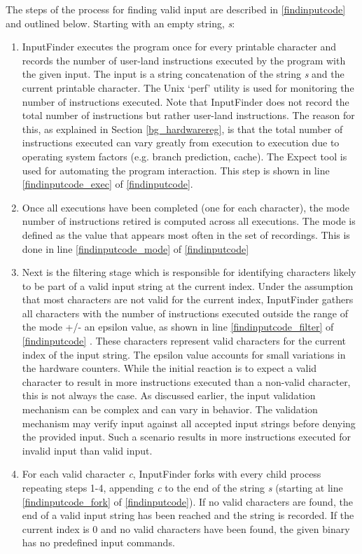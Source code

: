 \documentclass{acm_proc_article-sp}
\def \tool {InputFinder}
\begin{document}
The steps of the process for finding valid input are described in \autoref{findinputcode} and outlined below. Starting with an empty string, \textit{s}:
\begin{enumerate}
\item \tool{} executes the program once for every printable character and records the number of user-land instructions executed by the program with the given input. The input is a string concatenation of the string \textit{s} and the current printable character. The Unix `perf' utility is used for monitoring the number of instructions executed. Note that \tool{} does not record the total number of instructions but rather user-land instructions. The reason for this, as explained in Section \ref{bg_hardwarereg}, is that the total number of instructions executed can vary greatly from execution to execution due to operating system factors (e.g. branch prediction, cache). The Expect tool is used for automating the program interaction. This step is shown in line \autoref{findinputcode_exec} of \autoref{findinputcode}.
\item Once all executions have been completed (one for each character), the mode number of instructions retired is computed across all executions. The mode is defined as the value that appears most often in the set of recordings. This is done in line \autoref{findinputcode_mode} of \autoref{findinputcode}
\item Next is the filtering stage which is responsible for identifying characters likely to be part of a valid input string at the current index. Under the assumption that most characters are not valid for the current index, \tool{} gathers all characters with the number of instructions executed outside the range of the mode +/- an epsilon value, as shown in line \autoref{findinputcode_filter} of \autoref{findinputcode} . These characters represent valid characters for the current index of the input string. The epsilon value accounts for small variations in the hardware counters. While the initial reaction is to expect a valid character to result in more instructions executed than a non-valid character, this is not always the case. As discussed earlier, the input validation mechanism can be complex and can vary in behavior. The validation mechanism may verify input against all accepted input strings before denying the provided input. Such a scenario results in more instructions executed for invalid input than valid input.
\item For each valid character \textit{c}, \tool{} forks with every child process repeating steps 1-4, appending \textit{c} to the end of the string \textit{s} (starting at line \autoref{findinputcode_fork} of \autoref{findinputcode}). If no valid characters are found, the end of a valid input string has been reached and the string is recorded. If the current index is 0 and no valid characters have been found, the given binary has no predefined input commands.
\end{enumerate}
\end{document}
